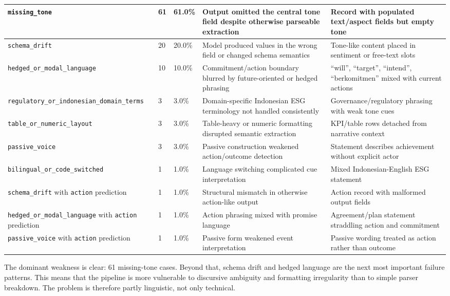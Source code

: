\documentclass[english, online, cse, master]{dithesis}
\begin{document}
\begin{landscape}
\begin{table}[p]
\begin{tabularx}{\linewidth}{|X|p{1.8cm}|p{1.8cm}|X|X|}
\texttt{missing\_tone} & 61 & 61.0\% & Output omitted the central tone field despite otherwise parseable extraction & Record with populated text/aspect fields but empty tone \\ \hline
\texttt{schema\_drift} & 20 & 20.0\% & Model produced values in the wrong field or changed schema semantics & Tone-like content placed in sentiment or free-text slots \\ \hline
\texttt{hedged\_or\_modal\_language} & 10 & 10.0\% & Commitment/action boundary blurred by future-oriented or hedged phrasing & “will”, “target”, “intend”, “berkomitmen” mixed with current actions \\ \hline
\texttt{regulatory\_or\_indonesian\_domain\_terms} & 3 & 3.0\% & Domain-specific Indonesian ESG terminology not handled consistently & Governance/regulatory phrasing with weak tone cues \\ \hline
\texttt{table\_or\_numeric\_layout} & 3 & 3.0\% & Table-heavy or numeric formatting disrupted semantic extraction & KPI/table rows detached from narrative context \\ \hline
\texttt{passive\_voice} & 3 & 3.0\% & Passive construction weakened action/outcome detection & Statement describes achievement without explicit actor \\ \hline
\texttt{bilingual\_or\_code\_switched} & 1 & 1.0\% & Language switching complicated cue interpretation & Mixed Indonesian-English ESG statement \\ \hline
\texttt{schema\_drift} with \texttt{action} prediction & 1 & 1.0\% & Structural mismatch in otherwise action-like output & Action record with malformed output fields \\ \hline
\texttt{hedged\_or\_modal\_language} with \texttt{action} prediction & 1 & 1.0\% & Action phrasing mixed with promise language & Agreement/plan statement straddling action and commitment \\ \hline
\texttt{passive\_voice} with \texttt{action} prediction & 1 & 1.0\% & Passive form weakened event interpretation & Passive wording treated as action rather than outcome \\ \hline
\end{tabularx}
\end{table}
\end{landscape}


The dominant weakness is clear: 61 missing-tone cases. Beyond that, schema drift and hedged language are the next most important failure patterns. This means that the pipeline is more vulnerable to discursive ambiguity and formatting irregularity than to simple parser breakdown. The problem is therefore partly linguistic, not only technical.
\end{document}
